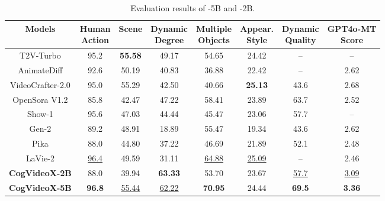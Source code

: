 
\begin{table}[t]
\caption{Evaluation results of \model-5B and \model-2B.}
\label{table:results}
\footnotesize
    \centering
    \begin{tabular}{cccccccc}
   \toprule
        Models & \Centerstack{Human \\Action}   & Scene & \Centerstack{Dynamic \\Degree} & \Centerstack{Multiple \\Objects} & \Centerstack{Appear. \\Style} & \Centerstack{Dynamic \\Quality} & \Centerstack{GPT4o-MT \\ Score}  \\ 
        \midrule
        T2V-Turbo & 95.2 & \textbf{55.58} & 49.17 & 54.65 & 24.42 & -- & --  \\ 
        AnimateDiff & 92.6  & 50.19 & 40.83 & 36.88 & 22.42 & -- & 2.62  \\ 
        VideoCrafter-2.0 & 95.0  & 55.29 & 42.50 & 40.66 & \textbf{25.13} & 43.6 & 2.68  \\ 
        OpenSora V1.2 & 85.8  & 42.47 & 47.22 & 58.41  & 23.89 & 63.7 & 2.52  \\ 
        Show-1 & 95.6  & 47.03 & 44.44 & 45.47  & 23.06 & 57.7 & --  \\ 
        Gen-2 & 89.2  & 48.91 & 18.89 & 55.47 & 19.34 & 43.6 & 2.62  \\ 
        Pika & 88.0  & 44.80 & 37.22 & 46.69  & 21.89 & 52.1 & 2.48  \\ 
        LaVie-2 & \underline{96.4} & 49.59 & 31.11 & \underline{64.88}  & \underline{25.09} & -- & 2.46  \\ 
        \hline
        \textbf{CogVideoX-2B} & 88.0 & 39.94 & \textbf{63.33} & 53.70 & 23.67 & \underline{57.7} & \underline{3.09} \\
        \textbf{CogVideoX-5B} & \textbf{96.8} & \underline{55.44} & \underline{62.22} & \textbf{70.95} & 24.44 & \textbf{69.5} & \textbf{3.36} \\
        \bottomrule
    \end{tabular}
    \vspace{-3mm}
\end{table}